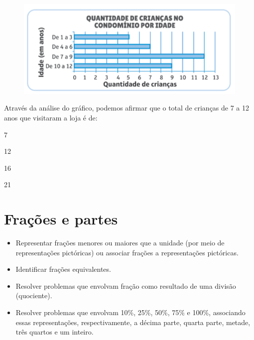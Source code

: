 \begin{figure}[htpb!]
\centering
\includegraphics[width=\textwidth]{./imgs/mat14.png}
\end{figure}

Através da análise do gráfico, podemos afirmar que o total de crianças de 7 a 12 anos que visitaram a loja é de:

\begin{minipage}{.5\textwidth}
\begin{escolha}
\item
  7
\item
  12
\item
  16
\item
  21
\end{escolha}
\end{minipage}

\chapter{Frações e partes}



\begin{itemize}
\item Representar frações menores ou maiores que a unidade (por meio de
representações pictóricas) ou associar frações a representações pictóricas.

\item Identificar frações equivalentes.

\item Resolver problemas que envolvam fração como resultado de uma divisão
(quociente).

\item Resolver problemas que envolvam 10\%, 25\%, 50\%, 75\% e 100\%,
associando essas representações, respectivamente, a décima parte, quarta parte, metade,
três quartos e um inteiro.
\end{itemize}

